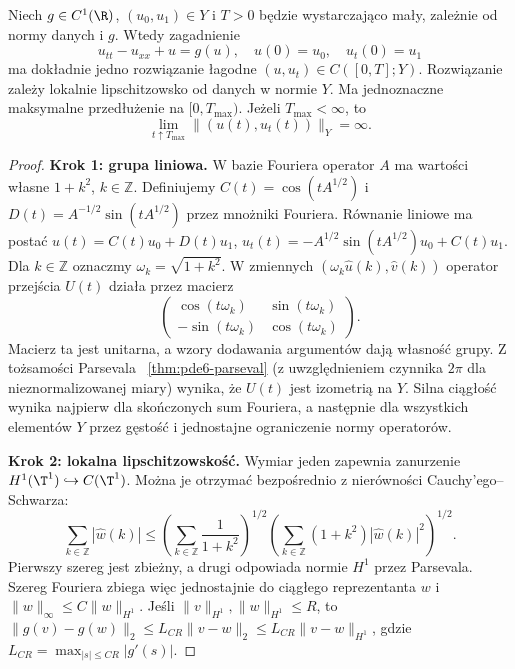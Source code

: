 \begin{twierdzenie}
\label{thm:pde25-wave}
Niech $g\in C^1(\R)$, $(u_0,u_1)\in Y$
i $T>0$ będzie wystarczająco mały, zależnie od normy
danych i $g$. Wtedy zagadnienie
\[
 u_{tt}-u_{xx}+u=g(u),\quad
 u(0)=u_0,\quad u_t(0)=u_1
\]
ma dokładnie jedno rozwiązanie łagodne
$(u,u_t)\in C([0,T];Y)$. Rozwiązanie zależy
lokalnie lipschitzowsko od danych w normie $Y$.
Ma jednoznaczne maksymalne przedłużenie na
$[0,T_{\max})$. Jeżeli $T_{\max}<\infty$, to
\[
 \lim_{t\uparrow T_{\max}}\|(u(t),u_t(t))\|_Y=\infty.
\]
\end{twierdzenie}
\begin{proof}
\textbf{Krok 1: grupa liniowa.} W bazie Fouriera operator
$A$ ma wartości własne $1+k^2$, $k\in\mathbb Z$.
Definiujemy $C(t)=\cos(tA^{1/2})$ i
$D(t)=A^{-1/2}\sin(tA^{1/2})$ przez mnożniki Fouriera.
Równanie liniowe ma postać
$u(t)=C(t)u_0+D(t)u_1$,
$u_t(t)=-A^{1/2}\sin(tA^{1/2})u_0+C(t)u_1$.
Dla $k\in\mathbb Z$ oznaczmy $\omega_k=\sqrt{1+k^2}$.
W zmiennych $(\omega_k\widehat u(k),\widehat v(k))$
operator przejścia $U(t)$ działa przez macierz
\[
 \begin{pmatrix}
 \cos(t\omega_k)&\sin(t\omega_k)\\
 -\sin(t\omega_k)&\cos(t\omega_k)
 \end{pmatrix}.
\]
Macierz ta jest unitarna, a wzory dodawania argumentów
dają własność grupy. Z tożsamości Parsevala
~\ref{thm:pde6-parseval} (z uwzględnieniem czynnika
$2\pi$ dla nieznormalizowanej miary) wynika,
że $U(t)$ jest izometrią na $Y$. Silna ciągłość
wynika najpierw dla skończonych sum Fouriera,
a następnie dla wszystkich elementów $Y$ przez
gęstość i jednostajne ograniczenie normy operatorów.

\textbf{Krok 2: lokalna lipschitzowskość.} Wymiar jeden
zapewnia zanurzenie $H^1(\T^1)\hookrightarrow C(\T^1)$.
Można je otrzymać bezpośrednio z nierówności
Cauchy'ego--Schwarza:
\[
 \sum_{k\in\mathbb Z}|\widehat w(k)|
 \le\left(\sum_{k\in\mathbb Z}\frac1{1+k^2}\right)^{1/2}
 \left(\sum_{k\in\mathbb Z}(1+k^2)|\widehat w(k)|^2\right)^{1/2}.
\]
Pierwszy szereg jest zbieżny, a drugi odpowiada
normie $H^1$ przez Parsevala. Szereg Fouriera
zbiega więc jednostajnie do ciągłego reprezentanta
$w$ i $\|w\|_\infty\le C\|w\|_{H^1}$.
Jeśli $\|v\|_{H^1},\|w\|_{H^1}\le R$, to
$\|g(v)-g(w)\|_2\le L_{CR}\|v-w\|_2
\le L_{CR}\|v-w\|_{H^1}$, gdzie
$L_{CR}=\max_{|s|\le CR}|g'(s)|$.


\end{proof}
